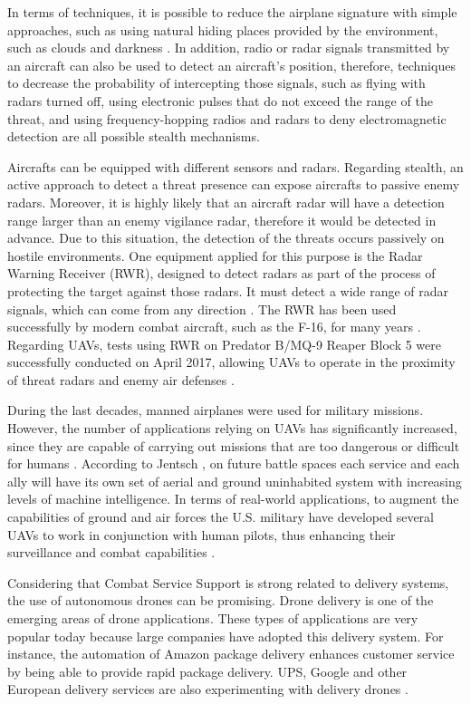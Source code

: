 In terms of techniques, it is possible to reduce the airplane signature with simple approaches, such as using natural hiding places provided by the environment, such as clouds and darkness \cite{haffa_2002}. In addition, radio or radar signals transmitted by an aircraft can also be used to detect an aircraft's position, therefore, techniques to decrease the probability of intercepting those signals, such as flying with radars turned off, using electronic pulses that do not exceed the range of the threat, and using frequency-hopping radios and radars to deny electromagnetic detection are all possible stealth mechanisms\cite{haffa_2002, friedman_2010}.

Aircrafts can be equipped with different sensors and radars. Regarding stealth, an active approach to detect a threat presence can expose aircrafts to passive enemy radars. Moreover, it is highly likely that an aircraft radar will have a detection range larger than an enemy vigilance radar, therefore it would be detected in advance. Due to this situation, the detection of the threats occurs passively on hostile environments. One equipment applied for this purpose is the Radar Warning Receiver (RWR), designed to detect radars as part of the process of protecting the target against those radars. It must detect a wide range of radar signals, which can come from any direction \cite{adamy2004}. The RWR has been used successfully by modern combat aircraft, such as the F-16, for many years \cite{brownlow_2008}. Regarding UAVs, tests using RWR on Predator B/MQ-9 Reaper Block 5 were successfully conducted on April 2017, allowing UAVs to operate in the proximity of threat radars and enemy air defenses \cite{osborn_2017}. 
  
  
During the last decades, manned airplanes were used for military missions. However, the number of applications relying on UAVs has significantly increased, since they are capable of carrying out missions that are too dangerous or difficult for humans \cite{mod_2011}. According to Jentsch \cite{jentsch_2016}, on future battle spaces each service and each ally will have its own set of aerial and ground uninhabited system with increasing levels of machine intelligence. In terms of real-world applications, to augment the capabilities of ground and air forces the U.S. military have developed several UAVs to work in conjunction with human pilots, thus enhancing their surveillance and combat capabilities \cite{mouloua_2001}. 

Considering that Combat Service Support is strong related to delivery systems, the use of autonomous drones can be promising. Drone delivery is one of the emerging areas of drone applications. These types of applications are very popular today because large companies have adopted this delivery system. For instance, the automation of Amazon package delivery enhances customer service by being able to provide rapid package delivery. UPS, Google and other European delivery services are also experimenting with delivery drones \cite{mack_2018}.


